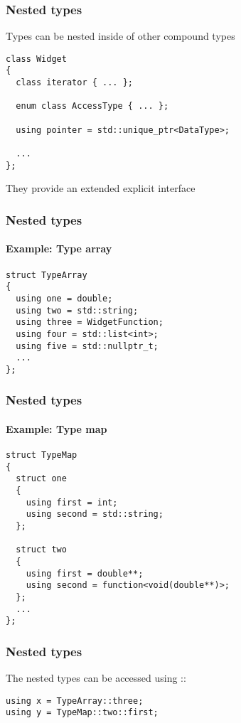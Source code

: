 \documentclass[14pt,a4paper,dvipsnames,usenames]{beamer}
\begin{document}
\begin{frame}[fragile]
  \frametitle{Nested types}

  Types can be nested inside of other compound types

  \vspace{.3cm}
  \begin{lstlisting}[deletekeywords={Widget}]
class Widget
{
  class iterator { ... };

  enum class AccessType { ... };

  using pointer = std::unique_ptr<DataType>;
  
  ...
};
  \end{lstlisting}

  \vspace{.3cm}
  They provide an extended explicit interface
  
\end{frame}

\begin{frame}[fragile]
  \frametitle{Nested types}
  \framesubtitle{Example: Type array}

  \begin{lstlisting}[morekeywords={WidgetFunction,string,nullptr_t}]
struct TypeArray
{
  using one = double;
  using two = std::string;
  using three = WidgetFunction;
  using four = std::list<int>;
  using five = std::nullptr_t;
  ...
};
  \end{lstlisting}

\end{frame}

\begin{frame}[fragile]
  \frametitle{Nested types}
  \framesubtitle{Example: Type map}

  \vspace*{-.3cm}
  \begin{lstlisting}[morekeywords={function,string}]
struct TypeMap
{
  struct one
  {
    using first = int;
    using second = std::string;
  };

  struct two
  {
    using first = double**;
    using second = function<void(double**)>;
  };
  ...
};
  \end{lstlisting}

\end{frame}

\begin{frame}[fragile]
  \frametitle{Nested types}

  The nested types can be accessed using {\color{Tropiteal}::}

  \vspace{1cm}
  \begin{lstlisting}[basicstyle=\ttfamily]
using x = TypeArray::three;
using y = TypeMap::two::first;
  \end{lstlisting}

\end{frame}
\end{document}
